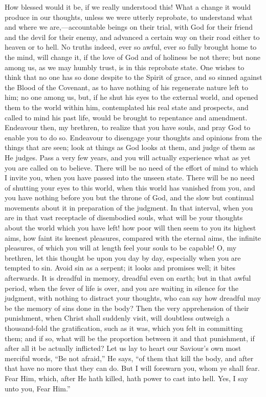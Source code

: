 How blessed would it be, if we really understood this! What a
change it would produce in our thoughts, unless we were utterly
reprobate, to understand what and where we are,—accountable beings
on their trial, with God for their friend and the devil for their
enemy, and advanced a certain way on their road either to heaven or to
hell. No truths indeed, ever so awful, ever so fully brought home to
the mind, will change it, if the love of God and of holiness be not
there; but none among us, as we may humbly trust, is in this reprobate
state. One wishes to think that no one has so done despite to the
Spirit of grace, and so sinned against the Blood of the Covenant, as
to have nothing of his regenerate nature left to him; no one among us,
but, if he shut his eyes to the external world, and opened them to the
world within him, contemplated his real state and prospects, and
called to mind his past life, would be brought to repentance and
amendment. Endeavour then, my brethren, to realize that you have
souls, and pray God to enable you to do so. Endeavour to disengage
your thoughts and opinions from the things that are seen; look at
things as God looks at them, and judge of them as He judges. Pass a
very few years, and you will actually experience what as yet you are
called on to believe. There will be no need of the effort of mind to
which I invite you, when you have passed into the unseen state. There
will be no need of shutting your eyes to this world, when this world
has vanished from you, and you have nothing before you but the throne
of God, and the slow but continual movements about it in preparation
of the judgment. In that interval, when you are in that vast
receptacle of disembodied souls, what will be your thoughts about the
world which you have left! how poor will then seem to you its highest
aims, how faint its keenest pleasures, compared with the eternal aims,
the infinite pleasures, of which you will at length feel your souls to
be capable! O, my brethren, let this thought be upon you day by day,
especially when you are tempted to sin. Avoid sin as a serpent; it
looks and promises well; it bites afterwards. It is dreadful in
memory, dreadful even on earth; but in that awful period, when the
fever of life is over, and you are waiting in silence for the
judgment, with nothing to distract your thoughts, who can say how
dreadful may be the memory of sins done in the body? Then the very
apprehension of their punishment, when Christ shall suddenly visit,
will doubtless outweigh a thousand-fold the gratification, such as it
was, which you felt in committing them; and if so, what will be the
proportion between it and that punishment, if after all it be actually
inflicted? Let us lay to heart our Saviour's own most merciful words,
``Be not afraid,'' He says, ``of them that kill the body,
and after that have no more that they can do. But I will forewarn you,
whom ye shall fear. Fear Him, which, after He hath killed, hath power
to cast into hell. Yes, I say unto you, Fear Him.''

